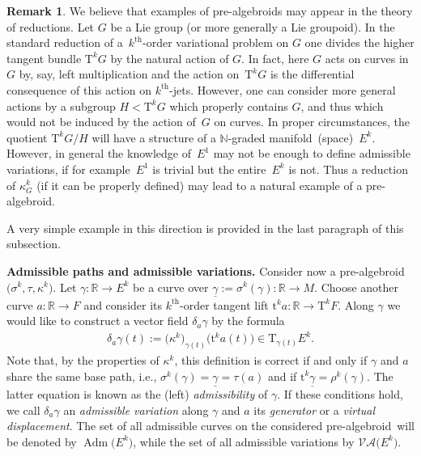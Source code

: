 \documentclass[pdftex]{sigma}
\newcommand{\grB}{{$\N$-graded manifold}}
\newcommand{\thh}[1]{#1^{\mathrm{th}}} %
\newcommand{\R}{\mathbb{R}}
\newcommand{\N}{\mathbb{N}}
\newcommand{\und}{\underline}
\newcommand{\ra}{\rightarrow}
\newcommand{\del}{\delta}
\newcommand{\prealg}{pre-algebroid} %
\newcommand{\T}{\mathrm{T}} %
\newcommand{\TT}[1]{\mathrm{T}^{#1}} %
\newcommand{\tclass}[2]{\bm{\mathrm{t}}^{#1}#2} %
\newcommand{\Adm}{\operatorname{Adm}} %
\newcommand{\VA}{\mathcal{VA}} %
\numberwithin{equation}{section}
\theoremstyle{definition}
\newtheorem{rem}[thm]{Remark}
\begin{document}
\begin{rem}\label{rem:pre_alg}We believe that examples of \prealg s may appear in the theory of reductions. Let $G$ be a Lie group (or more generally a Lie groupoid). In the standard reduction of a~$\thh{k}$-order variational problem on $G$ one divides the higher tangent bundle $\TT{k}G$ by the natural action of $G$. In fact, here $G$ acts on curves in~$G$ by, say, left multiplication and the action on~$\TT{k}G$ is the differential consequence of this action on $\thh{k}$-jets. However, one can consider more general actions by a subgroup $H<\TT{k} G$ which properly contains $G$, and thus which would not be induced by the action of~$G$ on curves. In proper circumstances, the quotient $\TT{k} G/H$ will have a structure of a \grB\ (space)~$E^k$. However, in general the knowledge of~$E^1$ may not be enough to define admissible variations, if for example~$E^1$ is trivial but the entire~$E^k$ is not. Thus a reduction of $\kappa_G^k$ (if it can be properly defined) may lead to a natural example of a \prealg .

A very simple example in this direction is provided in the last paragraph of this subsection.
\end{rem}

{\bf Admissible paths and admissible variations.} Consider now a \prealg\ $\big(\sigma^k,\tau,\kappa^k\big)$. Let $\gamma\colon \R\ra E^k$ be a curve over $\und{\gamma}:=\sigma^k( \gamma)\colon \R\ra M$. Choose another curve $a\colon \R\ra F$ and consider its $\thh{k}$-order tangent lift $\tclass{k}{a}\colon \R\ra \TT{k} F$. Along $\gamma$ we would like to construct a vector field $\del_a\gamma$ by the formula
\begin{gather}\label{eqn:adm_variation}
 \delta_a\gamma (t):=\big(\kappa^k\big)_{\gamma(t)}\big( \tclass{k}{a}(t)\big)\in \T_{\gamma (t)}E^k.
\end{gather}
Note that, by the properties of $\kappa^k$, this definition is correct if and only if $\gamma$ and $a$ share the same base path, i.e., $\sigma^k(\gamma)=\und{\gamma}=\tau(a)$ and if $\tclass{k}{\und{\gamma}}=\rho^k(\gamma)$. The latter equation is known as the (left) \emph{admissibility} of $\gamma$. If these conditions hold, we call $\delta_a\gamma$ an \emph{admissible variation} along $\gamma$ and $a$ its \emph{generator} or a \emph{virtual displacement}. The set of all admissible curves on the considered \prealg\ will be denoted by $\Adm\big(E^k\big)$, while the set of all admissible variations by $\VA\big(E^k\big)$.
\end{document}
